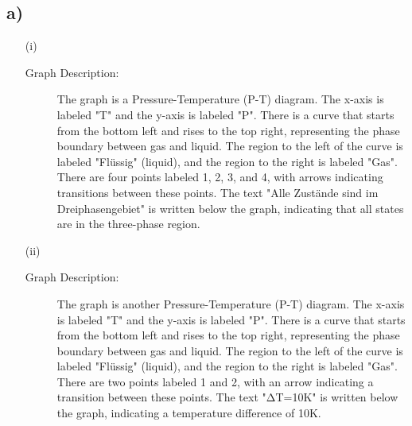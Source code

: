 

\subsection*{a)}

\begin{itemize}
    \item[(i)] 
    \begin{description}
        \item[Graph Description:] The graph is a Pressure-Temperature (P-T) diagram. The x-axis is labeled "T" and the y-axis is labeled "P". There is a curve that starts from the bottom left and rises to the top right, representing the phase boundary between gas and liquid. The region to the left of the curve is labeled "Flüssig" (liquid), and the region to the right is labeled "Gas". There are four points labeled 1, 2, 3, and 4, with arrows indicating transitions between these points. The text "Alle Zustände sind im Dreiphasengebiet" is written below the graph, indicating that all states are in the three-phase region.
    \end{description}
    
    \item[(ii)] 
    \begin{description}
        \item[Graph Description:] The graph is another Pressure-Temperature (P-T) diagram. The x-axis is labeled "T" and the y-axis is labeled "P". There is a curve that starts from the bottom left and rises to the top right, representing the phase boundary between gas and liquid. The region to the left of the curve is labeled "Flüssig" (liquid), and the region to the right is labeled "Gas". There are two points labeled 1 and 2, with an arrow indicating a transition between these points. The text "ΔT=10K" is written below the graph, indicating a temperature difference of 10K.
    \end{description}
\end{itemize}
